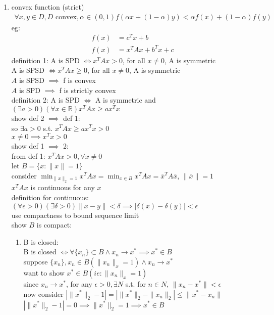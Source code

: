 \documentclass[12pt,letter]{article}
\newcommand{\R}{\mathbb{R}}
\begin{document}

\begin{enumerate}
\item convex function (strict)
  \begin{align*}
    \forall x,y \in D, D \text{ convex}, \alpha \in (0,1) f(\alpha x+(1-\alpha)y) < \alpha f(x) + (1-\alpha) f(y)
  \end{align*}
  eg:
  \begin{align*}
    f(x) &= c^Tx + b\\
    f(x) &= x^TAx + b^Tx + c
  \end{align*}
  definition 1: A is SPD $\iff x^T A x > 0$, for all $x \neq 0$, A is symmetric\\
  A is SPSD $\iff x^T A x \geq 0$, for all $x \neq 0$, A is symmetric\\
  $A$ is SPSD $\implies$ f is convex\\  
  $A$ is SPD $\implies$ f is strictly convex\\
  definition 2: A is SPD $\iff$ A is symmetric and $(\exists a>0) (\forall x \in \R) x^TAx \geq a x^Tx$\\

  show def 2 $\implies$ def 1:\\
  so $\exists a>0$ s.t. $x^TAx \geq a x^Tx > 0$\\
  $x \neq 0 \implies x^Tx > 0$\\
  
  show def 1 $\implies$ 2:\\
  from def 1: $x^TAx > 0, \forall x \neq 0$\\
  let $B=\{x: \|x\|=1\}$\\
  consider $\min_{\|x\|_2=1} x^TAx=\min_{x \in B} x^TAx=\bar{x}^TA\bar{x}$, $\|\bar{x}\|=1$\\
  $x^TAx$ is continuous for any $x$\\
  definition for continuous: $(\forall \epsilon>0) (\exists \delta >0) \|x-y\|< \delta \implies |\delta(x)-\delta(y)| < \epsilon$\\
  use compactness to bound sequence limit\\
  show $B$ is compact:\\
  \begin{enumerate}
  \item B is closed:\\
    B is closed $\iff \forall \{x_n\} \subset B \wedge x_n \to x^* \implies x^* \in B$\\
    suppose $\{x_n\},  x_n\in B (\|x_n\|_x=1) \wedge x_n \to x^*$\\
    want to show $x^* \in B (ie: \|x_n\|_x=1)$\\
    since $x_n \to x^*$, for any $\epsilon > 0, \exists N$ s.t. for $n\in N$, $\|x_n-x^*\| < \epsilon$\\
    now consider $| \|x^*\|_2 -1 | = | \|x^*\|_2 - \|x_n\|_2 | \leq \| x^*-x_n\|$\\
    $| \|x^*\|_2 -1 | = 0 \implies \|x^*\|_2 = 1 \implies x^* \in B$
    

\end{enumerate}
\end{enumerate}
\end{document}
